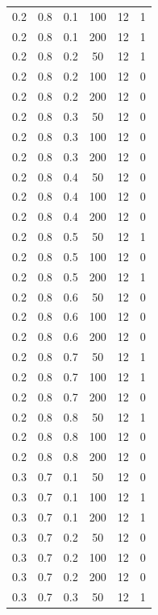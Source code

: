 \documentclass[a4paper,14pt, unknownkeysallowed]{extreport}
\begin{document}
\begin{center}
\begin{longtable}[c]{|c|c|c|c|c|c|}
	0.2 &  0.8 &  0.1 &  100 &    12 &     1 \\
	0.2 &  0.8 &  0.1 &  200 &    12 &     1 \\
   \hline
	0.2 &  0.8 &  0.2 &   50 &    12 &     1 \\
	0.2 &  0.8 &  0.2 &  100 &    12 &     0 \\
	0.2 &  0.8 &  0.2 &  200 &    12 &     0 \\
   \hline
	0.2 &  0.8 &  0.3 &   50 &    12 &     0 \\
	0.2 &  0.8 &  0.3 &  100 &    12 &     0 \\
	0.2 &  0.8 &  0.3 &  200 &    12 &     0 \\
   \hline
	0.2 &  0.8 &  0.4 &   50 &    12 &     0 \\
	0.2 &  0.8 &  0.4 &  100 &    12 &     0 \\
	0.2 &  0.8 &  0.4 &  200 &    12 &     0 \\
   \hline
	0.2 &  0.8 &  0.5 &   50 &    12 &     1 \\
	0.2 &  0.8 &  0.5 &  100 &    12 &     0 \\
	0.2 &  0.8 &  0.5 &  200 &    12 &     1 \\
   \hline
	0.2 &  0.8 &  0.6 &   50 &    12 &     0 \\
	0.2 &  0.8 &  0.6 &  100 &    12 &     0 \\
	0.2 &  0.8 &  0.6 &  200 &    12 &     0 \\
   \hline
	0.2 &  0.8 &  0.7 &   50 &    12 &     1 \\
	0.2 &  0.8 &  0.7 &  100 &    12 &     1 \\
	0.2 &  0.8 &  0.7 &  200 &    12 &     0 \\
   \hline
	0.2 &  0.8 &  0.8 &   50 &    12 &     1 \\
	0.2 &  0.8 &  0.8 &  100 &    12 &     0 \\
	0.2 &  0.8 &  0.8 &  200 &    12 &     0 \\
   \hline
	0.3 &  0.7 &  0.1 &   50 &    12 &     0 \\
	0.3 &  0.7 &  0.1 &  100 &    12 &     1 \\
	0.3 &  0.7 &  0.1 &  200 &    12 &     1 \\
   \hline
	0.3 &  0.7 &  0.2 &   50 &    12 &     0 \\
	0.3 &  0.7 &  0.2 &  100 &    12 &     0 \\
	0.3 &  0.7 &  0.2 &  200 &    12 &     0 \\
   \hline
	0.3 &  0.7 &  0.3 &   50 &    12 &     1 \\

\end{longtable}
\end{center}
\end{document}
